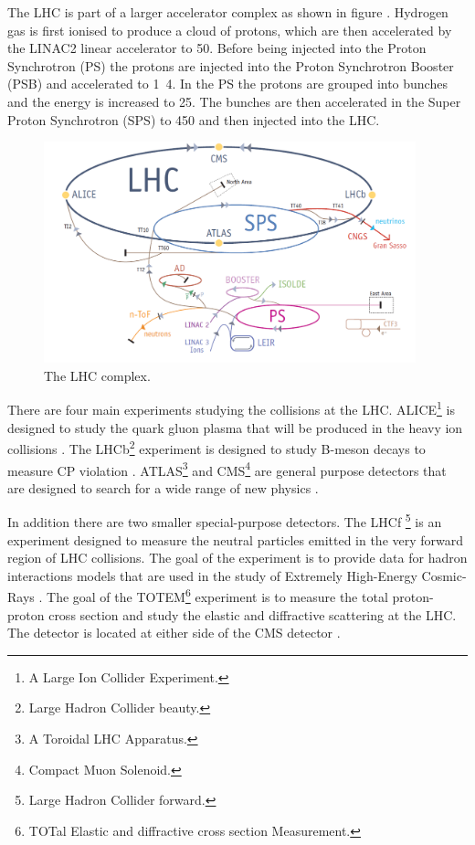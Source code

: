 The LHC is part of a larger accelerator complex as shown in figure
. Hydrogen gas is first ionised to produce a cloud of
protons, which are then accelerated by the LINAC2 linear accelerator to
\unit{50}{\MeV}.  Before being injected into the Proton Synchrotron (PS) the
protons are injected into the Proton Synchrotron Booster (PSB) and accelerated
to \unit{1.4}{\GeV}. In the PS the protons are grouped into bunches and the
energy is increased to \unit{25}{\GeV}. The bunches are then accelerated in the
Super Proton Synchrotron (SPS) to \unit{450}{\GeV} and then injected into the
LHC.

\begin{figure}[htbp]
  \centering
  \includegraphics[width=0.96\textwidth]{accelerators.png}
  \caption{The LHC complex.}
  \label{fig:LHCcomplex}
\end{figure}

There are four main experiments studying the collisions at the
{LHC}.  
ALICE\footnote{A Large Ion Collider Experiment.} is designed to study the quark
gluon plasma that will be produced in the heavy ion collisions
\cite{aamodt2008alice}.
The LHCb\footnote{Large Hadron Collider beauty.} experiment is designed to study
B-meson decays to measure CP violation \cite{alves2008lhcb}.
ATLAS\footnote{A Toroidal LHC Apparatus.} and CMS\footnote{Compact Muon
Solenoid.} are general purpose detectors that are designed to search for a wide
range of new physics \cite{chatrchyan2008cms,aad2008atlas}.

In addition there are two smaller special-purpose detectors.
The LHCf \footnote{Large Hadron Collider forward.} is an experiment designed to
measure the neutral particles emitted in the very forward region of LHC
collisions.  The goal of the experiment is to provide data for hadron
interactions models that are used in the study of Extremely High-Energy
Cosmic-Rays \cite{adriani2008lhcf}.
The goal of the TOTEM\footnote{TOTal Elastic and diffractive cross section
Measurement.} experiment is to measure the total proton-proton
cross section and study the elastic and diffractive scattering at the LHC. The
detector is located at either side of the CMS detector \cite{anelli2008totem}.

